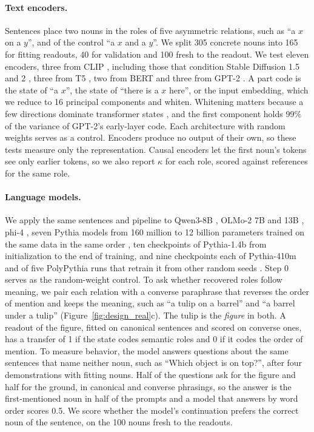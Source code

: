 \documentclass[10pt]{article}
\theoremstyle{plain}
\theoremstyle{remark}
\begin{document}
\paragraph{Text encoders.} Sentences place two nouns in the roles of five asymmetric relations, such as ``a $x$ on a $y$'', and of the control ``a $x$ and a $y$''. We split 305 concrete nouns into 165 for fitting readouts, 40 for validation and 100 fresh to the readout. We test eleven encoders, three from CLIP \citep{radford2021clip}, including those that condition Stable Diffusion 1.5 and 2 \citep{rombach2022}, three from T5 \citep{raffel2020t5}, two from BERT \citep{devlin2019bert} and three from GPT-2 \citep{radford2019gpt2}. A part code is the state of ``a $x$'', the state of ``there is a $x$ here'', or the input embedding, which we reduce to 16 principal components and whiten. Whitening matters because a few directions dominate transformer states \citep{ethayarajh2019,timkey2021}, and the first component holds 99\% of the variance of GPT-2's early-layer code. Each architecture with random weights serves as a control. Encoders produce no output of their own, so these tests measure only the representation. Causal encoders let the first noun's tokens see only earlier tokens, so we also report $\kappa$ for each role, scored against references for the same role.

\paragraph{Language models.} We apply the same sentences and pipeline to Qwen3-8B \citep{yang2025qwen3}, OLMo-2 7B and 13B \citep{olmo2024olmo2}, phi-4 \citep{abdin2024phi4}, seven Pythia models from 160 million to 12 billion parameters trained on the same data in the same order \citep{biderman2023pythia}, ten checkpoints of Pythia-1.4b from initialization to the end of training, and nine checkpoints each of Pythia-410m and of five PolyPythia runs that retrain it from other random seeds \citep{vanderwal2025polypythias}. Step 0 serves as the random-weight control. To ask whether recovered roles follow meaning, we pair each relation with a converse paraphrase that reverses the order of mention and keeps the meaning, such as ``a tulip on a barrel'' and ``a barrel under a tulip'' (Figure~\ref{fig:design_real}c). The tulip is the \emph{figure} in both. A readout of the figure, fitted on canonical sentences and scored on converse ones, has a transfer of 1 if the state codes semantic roles and 0 if it codes the order of mention. To measure behavior, the model answers questions about the same sentences that name neither noun, such as ``Which object is on top?'', after four demonstrations with fitting nouns. Half of the questions ask for the figure and half for the ground, in canonical and converse phrasings, so the answer is the first-mentioned noun in half of the prompts and a model that answers by word order scores 0.5. We score whether the model's continuation prefers the correct noun of the sentence, on the 100 nouns fresh to the readouts.
\end{document}
